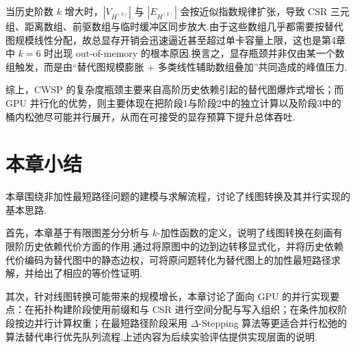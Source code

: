 当历史阶数 $k$ 增大时，$|V_{H^{(k)}}|$ 与 $|E_{H^{(k)}}|$ 会按近似指数规律扩张，导致 CSR 三元组、距离数组、前驱数组与临时缓冲区同步放大.由于这些数组几乎都需要按替代图规模线性分配，故总显存开销会迅速逼近甚至超过单卡容量上限，这也是第4章中 $k=6$ 时出现 out-of-memory 的根本原因.换言之，显存瓶颈并非仅由某一个数组触发，而是由“替代图规模膨胀 + 多类线性辅助数组叠加”共同造成的峰值压力.

综上，CWSP 的复杂度瓶颈主要来自高阶历史依赖引起的替代图爆炸式增长；而 GPU 并行化的优势，则主要体现在把阶段1与阶段2中的独立计算以及阶段3中的桶内松弛尽可能并行展开，从而在可接受的显存预算下提升总体吞吐.

\section{本章小结}

本章围绕非加性最短路径问题的建模与求解流程，讨论了线图转换及其并行实现的基本思路.

首先，本章基于有限图差分分析与 $k$-加性函数的定义，说明了线图转换在刻画有限阶历史依赖代价方面的作用.通过将原图中的边到边转移显式化，并将历史依赖代价编码为替代图中的静态边权，可将原问题转化为替代图上的加性最短路径求解，并给出了相应的等价性证明.

其次，针对线图转换可能带来的规模增长，本章讨论了面向 GPU 的并行实现要点：在拓扑构建阶段使用前缀和与 CSR 进行空间分配与写入组织；在条件加权阶段按边并行计算权重；在最短路径阶段采用 $\Delta$-Stepping 算法等更适合并行松弛的算法替代串行优先队列流程.上述内容为后续实验评估提供实现层面的说明.

\flushbottom
